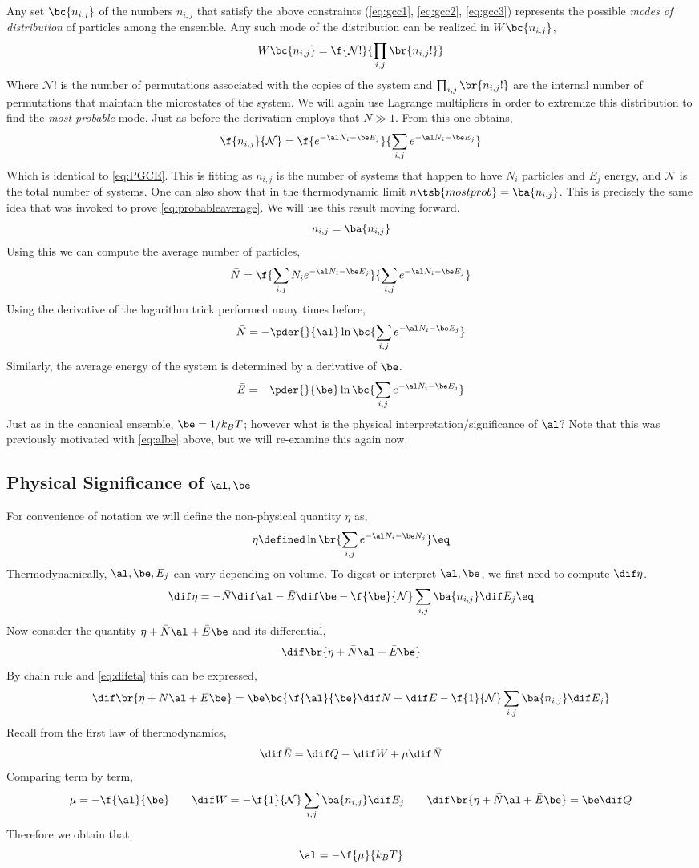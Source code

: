 \documentclass{article}
\begin{document}
{Any set $\bc{n_{i,j}}$ of the numbers $n_{i,j}$ that satisfy the above constraints (\eqref{eq:gcc1}, \eqref{eq:gcc2}, \eqref{eq:gcc3}) represents the possible \textit{modes of distribution} of particles among the ensemble. Any such mode of the distribution can be realized in $W\bc{n_{i,j}}$,
\[ W \bc{n_{i,j}} = \f{\mathcal{N}!}{\prod_{i,j} \br{n_{i,j} !}} \]
Where $\mathcal{N}!$ is the number of permutations associated with the copies of the system and $\prod_{i,j} \br{n_{i,j} !}$ are the internal number of permutations that maintain the microstates of the system. We will again use Lagrange multipliers in order to extremize this distribution to find the \textit{most probable} mode. Just as before the derivation employs that $N \gg 1$. From this one obtains,
\[ \f{n_{i,j}}{\mathcal{N}} =  \f{e^{-\al N_i - \be E_j}}{\sum_{i,j}e^{-\al N_i - \be E_j}}\]
Which is identical to \eqref{eq:PGCE}. This is fitting as $n_{i,j}$ is the number of systems that happen to have $N_i$ particles and $E_j$ energy, and $\mathcal{N}$ is the total number of systems. One can also show that in the thermodynamic limit $n\tsb{most prob} = \ba{n_{i,j}}$. This is precisely the same idea that was invoked to prove \eqref{eq:probableaverage}. We will use this result moving forward.
\[ n_{i,j} = \ba{n_{i,j}} \]
Using this we can compute the average number of particles,
\[ \bar{N} = \f{\sum_{i,j} N_i e^{-\al N_i - \be E_j}}{\sum_{i,j}e^{-\al N_i - \be E_j}} \]
Using the derivative of the logarithm trick performed many times before,
\[ \bar{N} = -\pder{}{\al}\ln \bc{\sum_{i,j} e^{-\al N_i - \be E_j}} \]
Similarly, the average energy of the system is determined by a derivative of $\be$.
\[ \bar{E} = -\pder{}{\be}\ln \bc{\sum_{i,j} e^{-\al N_i - \be E_j}} \]
Just as in the canonical ensemble, $\be = 1/k_B T$; however what is the physical interpretation/significance of $\al$? Note that this was previously motivated with \eqref{eq:albe} above, but we will re-examine this again now.

\subsection{Physical Significance of $\al, \be$}

For convenience of notation we will define the non-physical quantity $\eta$ as,
\[ \eta \defined \ln \br{\sum_{i,j} e^{-\al N_i - \be N_j}} \eq \label{eq:eta}\]
Thermodynamically, $\al, \be, E_j$ can vary depending on volume. To digest or interpret $\al, \be$, we first need to compute $\dif \eta$.
\[ \dif \eta = - \bar{N} \dif \al - \bar{E} \dif \be - \f{\be}{\mathcal{N}} \sum_{i,j} \ba{n_{i,j}} \dif E_j \eq \label{eq:difeta}\]
Now consider the quantity $\eta + \bar{N} \al + \bar{E} \be$ and its differential,
\[ \dif \br{\eta + \bar{N} \al + \bar{E} \be} \]
By chain rule and \eqref{eq:difeta} this can be expressed,
\[ \dif \br{\eta + \bar{N} \al + \bar{E} \be} = \be \bc{ \f{\al}{\be}\dif \bar{N} + \dif \bar{E} -\f{1}{\mathcal{N}} \sum_{i,j} \ba{n_{i,j}} \dif E_j } \]
Recall from the first law of thermodynamics,
\[ \dif \bar{E} = \dif Q - \dif W + \mu \dif \bar{N} \]
Comparing term by term,
\[ \mu = - \f{\al}{\be} \qquad \dif W = - \f{1}{\mathcal{N}} \sum_{i,j} \ba{n_{i,j}} \dif E_j \qquad \dif \br{\eta + \bar{N} \al + \bar{E} \be} = \be \dif Q\]
Therefore we obtain that,
\[ \al = -\f{\mu}{k_B T} \]
}
\end{document}
